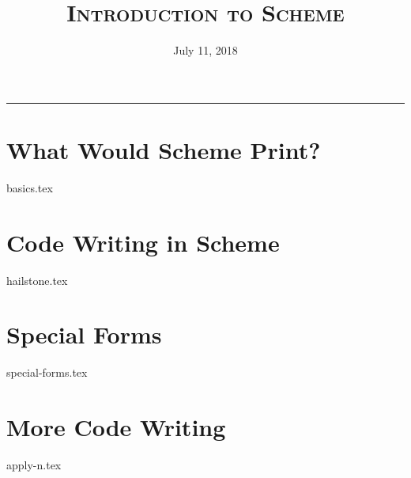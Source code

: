 \documentclass{exam}
\title{\textsc{Introduction to Scheme}}
\date{July 11, 2018}
\begin{document}
\maketitle
\rule{\textwidth}{0.15em}
\fontsize{12}{15}\selectfont

\begin{questions}
\section{What Would Scheme Print?}
{basics.tex}


\section{Code Writing in Scheme}
{hailstone.tex}


\section{Special Forms}
{special-forms.tex}

\section{More Code Writing}
{apply-n.tex}

\end{questions}
\end{document}
